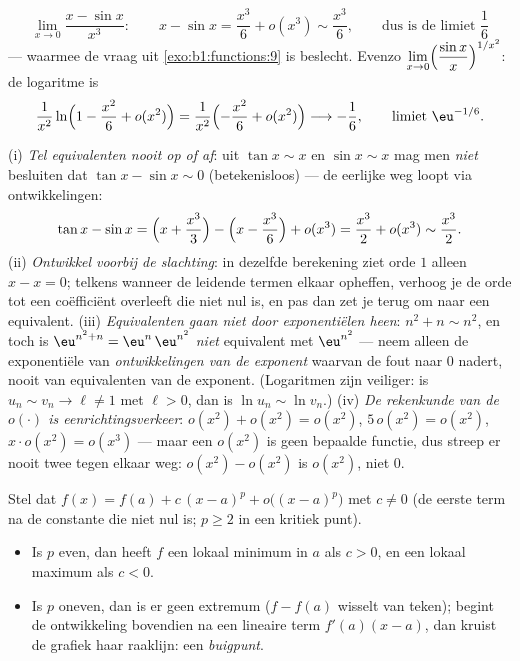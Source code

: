 \begin{example}[Limieten]\label{ex:b1:taylor:limits}
\[
\lim_{x \to 0} \frac{x - \sin x}{x^3}:
\qquad
x - \sin x = \frac{x^3}{6} + o(x^3) \sim \frac{x^3}{6},
\qquad\text{dus is de limiet } \frac16
\]
--- waarmee de vraag uit \cref{exo:b1:functions:9} is beslecht.
Evenzo $\displaystyle\lim_{x\to0}\Bigl(\frac{\sin
x}{x}\Bigr)^{1/x^2}$: de logaritme is
\[
\frac{1}{x^2}\ln\Bigl(1 - \frac{x^2}{6} + o(x^2)\Bigr)
= \frac{1}{x^2}\Bigl(-\frac{x^2}{6} + o(x^2)\Bigr)
\longrightarrow -\frac16,
\qquad\text{limiet } \eu^{-1/6}.
\]
\end{example}

\begin{remark}
(i) \emph{Tel equivalenten nooit op of af}: uit $\tan x \sim x$
en $\sin x \sim x$ mag men \emph{niet} besluiten dat $\tan x -
\sin x \sim 0$ (betekenisloos) --- de eerlijke weg loopt via
ontwikkelingen:
\[
\tan x - \sin x
= \Bigl(x + \frac{x^3}{3}\Bigr) - \Bigl(x - \frac{x^3}{6}\Bigr)
+ o(x^3) = \frac{x^3}{2} + o(x^3) \sim \frac{x^3}{2} .
\]
(ii) \emph{Ontwikkel voorbij de slachting}: in dezelfde
berekening ziet orde $1$ alleen $x - x = 0$; telkens wanneer de
leidende termen elkaar opheffen, verhoog je de orde tot een
coëfficiënt overleeft die niet nul is, en pas dan zet je terug om
naar een equivalent. (iii) \emph{Equivalenten gaan niet door
exponentiëlen heen}: $n^2 + n \sim n^2$, en toch is
$\eu^{n^2+n} = \eu^{n}\,\eu^{n^2}$ \emph{niet} equivalent met
$\eu^{n^2}$ --- neem alleen de exponentiële van
\emph{ontwikkelingen van de exponent} waarvan de fout naar $0$
nadert, nooit van equivalenten van de exponent. (Logaritmen zijn
veiliger: is $u_n \sim v_n \to \ell \neq 1$ met $\ell > 0$, dan
is $\ln u_n \sim \ln v_n$.) (iv) \emph{De rekenkunde van de
$o(\cdot)$ is eenrichtingsverkeer}: $o(x^2) + o(x^2) = o(x^2)$,
$5\,o(x^2) = o(x^2)$, $x\cdot o(x^2) = o(x^3)$ --- maar een
$o(x^2)$ is geen bepaalde functie, dus streep er nooit twee
tegen elkaar weg: $o(x^2) - o(x^2)$ is $o(x^2)$, niet $0$.
\end{remark}

\begin{proposition}\label{prop:b1:taylor:local}
Stel dat $f(x) = f(a) + c\,(x - a)^p + o\bigl((x-a)^p\bigr)$ met $c
\neq 0$ (de eerste term na de constante die niet nul is; $p \geq 2$
in een kritiek punt).
\begin{itemize}
  \item Is $p$ even, dan heeft $f$ een lokaal minimum in $a$ als $c
        > 0$, en een lokaal maximum als $c < 0$.
  \item Is $p$ oneven, dan is er geen extremum ($f - f(a)$ wisselt
        van teken); begint de ontwikkeling bovendien na een lineaire
        term $f'(a)(x - a)$, dan kruist de grafiek haar raaklijn:
        een \emph{buigpunt}.
\end{itemize}
\end{proposition}

